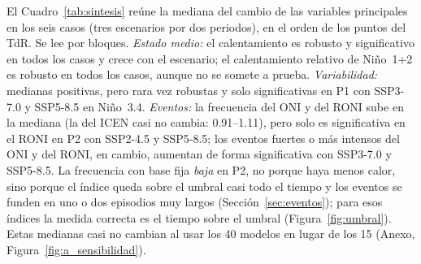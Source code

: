 \documentclass[11pt,a4paper]{article}
\begin{document}
El Cuadro~\ref{tab:sintesis} reúne la mediana del cambio de las variables principales en los seis casos (tres escenarios por dos periodos), en el orden de los puntos del TdR.
Se lee por bloques.
\emph{Estado medio:} el calentamiento es robusto y significativo en todos los casos y crece con el escenario; el calentamiento relativo de Niño~1+2 es robusto en todos los casos, aunque no se somete a prueba.
\emph{Variabilidad:} medianas positivas, pero rara vez robustas y solo significativas en P1 con SSP3-7.0 y SSP5-8.5 en Niño~3.4.
\emph{Eventos:} la frecuencia del ONI y del RONI sube en la mediana (la del ICEN casi no cambia: 0.91--1.11), pero solo es significativa en el RONI en P2 con SSP2-4.5 y SSP5-8.5; los eventos fuertes o más intensos del ONI y del RONI, en cambio, aumentan de forma significativa con SSP3-7.0 y SSP5-8.5.
La frecuencia con base fija \emph{baja} en P2, no porque haya menos calor, sino porque el índice queda sobre el umbral casi todo el tiempo y los eventos se funden en uno o dos episodios muy largos (Sección~\ref{sec:eventos}); para esos índices la medida correcta es el tiempo sobre el umbral (Figura~\ref{fig:umbral}).
Estas medianas casi no cambian al usar los 40 modelos en lugar de los 15 (Anexo, Figura~\ref{fig:a_sensibilidad}).
\end{document}
